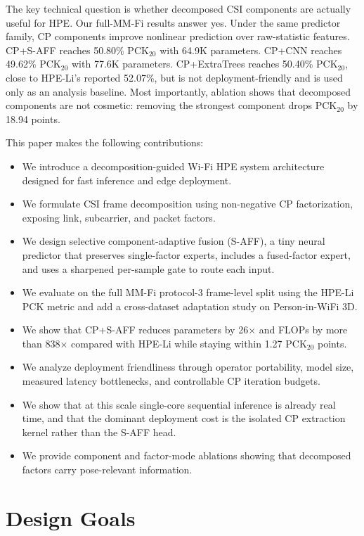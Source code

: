 \documentclass[10pt,conference]{IEEEtran}
\begin{document}
The key technical question is whether decomposed CSI components are actually useful for HPE. Our full-MM-Fi results answer yes. Under the same predictor family, CP components improve nonlinear prediction over raw-statistic features. CP+S-AFF reaches 50.80\% PCK$_{20}$ with 64.9K parameters. CP+CNN reaches 49.62\% PCK$_{20}$ with 77.6K parameters. CP+ExtraTrees reaches 50.40\% PCK$_{20}$, close to HPE-Li's reported 52.07\%, but is not deployment-friendly and is used only as an analysis baseline. Most importantly, ablation shows that decomposed components are not cosmetic: removing the strongest component drops PCK$_{20}$ by 18.94 points.

This paper makes the following contributions:
\begin{itemize}
    \item We introduce a decomposition-guided Wi-Fi HPE system architecture designed for fast inference and edge deployment.
    \item We formulate CSI frame decomposition using non-negative CP factorization, exposing link, subcarrier, and packet factors.
    \item We design selective component-adaptive fusion (S-AFF), a tiny neural predictor that preserves single-factor experts, includes a fused-factor expert, and uses a sharpened per-sample gate to route each input.
    \item We evaluate on the full MM-Fi protocol-3 frame-level split using the HPE-Li PCK metric and add a cross-dataset adaptation study on Person-in-WiFi 3D.
    \item We show that CP+S-AFF reduces parameters by 26$\times$ and FLOPs by more than 838$\times$ compared with HPE-Li while staying within 1.27 PCK$_{20}$ points.
    \item We analyze deployment friendliness through operator portability, model size, measured latency bottlenecks, and controllable CP iteration budgets.
    \item We show that at this scale single-core sequential inference is already real time, and that the dominant deployment cost is the isolated CP extraction kernel rather than the S-AFF head.
    \item We provide component and factor-mode ablations showing that decomposed factors carry pose-relevant information.
\end{itemize}

\section{Design Goals}
\end{document}
